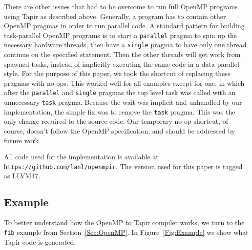 \documentclass[sigconf]{acmart}
\begin{document}
There are other issues that had to be overcome to run full OpenMP programs
using Tapir as described above. Generally, a program has to contain other
OpenMP pragmas in order to run parallel code. A standard pattern for building
task-parallel OpenMP programs is to start a \texttt{parallel} pragma to spin up
the necessary hardware threads, then have a \texttt{single} pragma to have only
one thread continue on the specified statement. Then the other threads will get
work from spawned tasks, instead of implicitly executing the same code in a
data parallel style. For the purpose of this paper, we took the shortcut of
replacing these pragmas with no-ops. This worked well for all examples except
for one, in which after the \texttt{parallel} and \texttt{single} pragmas the
top level task was called with an unnecessary \texttt{task} pragma. Because the
wait was implicit and unhandled by our implementation, the simple fix was to
remove the \texttt{task} pragma. This was the only change required to the 
source code. Our temporary no-op shortcut, of course, doesn't follow the OpenMP
specification, and should be addressed by future work. 

All code used for the implementation is available at
\texttt{https://github.com/lanl/openmpir}. The version used for this paper is
tagged as LLVM17.

\subsection{Example} \label{Sec:Example}

To better understand how the OpenMP to Tapir compiler works, we turn to the
\texttt{fib} example from Section~\ref{Sec:OpenMP}. In Figure~\ref{Fig:Example}
we show what Tapir code is generated.  
\end{document}
